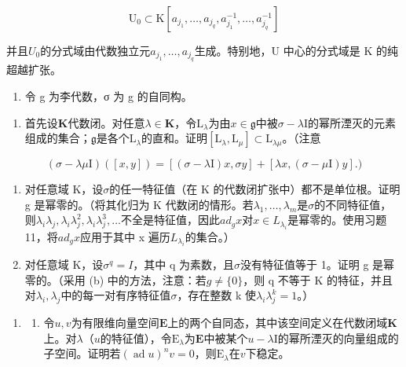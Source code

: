 \[
\mathrm{U} _ {0} \subset \mathrm{K} [ a _ {j _ {1}}, \dots , a _ {j _ {q}}, a _ {j _ {1}} ^ {- 1}, \dots , a _ {j _ {q}} ^ {- 1} ]
\]

并且\(U_{0}\)的分式域由代数独立元\(a_{j_{1}},\ldots,a_{j_{q}}\)生成。特别地，U 中心的分式域是 K 的纯超越扩张。

\begin{enumerate}
\def\labelenumi{\arabic{enumi}.}
\setcounter{enumi}{20}
\tightlist
\item
  令 g 为李代数，σ 为 g 的自同构。
\end{enumerate}

\begin{enumerate}
\def\labelenumi{(\alph{enumi})}
\tightlist
\item
  首先设\(\mathbf{K}\)代数闭。对任意\(\lambda \in \mathbf{K}\)，令\(\mathrm{L}_{\lambda}\)为由\(x \in \mathfrak{g}\)中被\(\sigma - \lambda \mathrm{I}\)的幂所湮灭的元素组成的集合；\(\mathfrak{g}\)是各个\(\mathrm{L}_{\lambda}\)的直和。证明\([\mathrm{L}_{\lambda}, \mathrm{L}_{\mu}] \subset \mathrm{L}_{\lambda \mu}\)。（注意
\end{enumerate}

\[
(\sigma - \lambda \mu \mathrm{I}) ([ x, y ]) = [ (\sigma - \lambda \mathrm{I}) x, \sigma y ] + [ \lambda x, (\sigma - \mu \mathrm{I}) y ].)
\]

\begin{enumerate}
\def\labelenumi{(\alph{enumi})}
\setcounter{enumi}{1}
\item
  对任意域 K，设\(\sigma\)的任一特征值（在 K 的代数闭扩张中）都不是单位根。证明 g 是幂零的。（将其化归为 K 代数闭的情形。若\(\lambda_{1},\ldots,\lambda_{m}\)是\(\sigma\)的不同特征值，则\(\lambda_{i}\lambda_{j},\lambda_{i}\lambda_{j}^{2},\lambda_{i}\lambda_{j}^{3},\ldots\)不全是特征值，因此\(ad_{g}x\)对\(x\in L_{\lambda_{i}}\)是幂零的。使用习题 11，将\(ad_{g}x\)应用于其中 x 遍历\(L_{\lambda_{i}}\)的集合。）
\item
  对任意域 K，设\(\sigma^{q}=I\)，其中 q 为素数，且\(\sigma\)没有特征值等于 1。证明 g 是幂零的。（采用 (b) 中的方法，注意：若\(g\neq\{0\}\)，则 q 不等于 K 的特征，并且对\(\lambda_{i},\lambda_{j}\)中的每一对有序特征值\(\sigma\)，存在整数 k 使\(\lambda_{i}\lambda_{j}^{k}=1\)。）
\end{enumerate}

\begin{enumerate}
\def\labelenumi{\arabic{enumi}.}
\setcounter{enumi}{21}
\tightlist
\item
  \begin{enumerate}
  \def\labelenumii{(\alph{enumii})}
  \tightlist
  \item
    令\(u, v\)为有限维向量空间\(\mathbf{E}\)上的两个自同态，其中该空间定义在代数闭域\(\mathbf{K}\)上。对\(\lambda\)（\(u\)的特征值），令\(\mathrm{E}_{\lambda}\)为\(\mathbf{E}\)中被某个\(u - \lambda \mathrm{I}\)的幂所湮灭的向量组成的子空间。证明若\((\operatorname{ad} u)^n v = 0\)，则\(\mathrm{E}_{\lambda}\)在\(v\)下稳定。
  \end{enumerate}
\end{enumerate}

